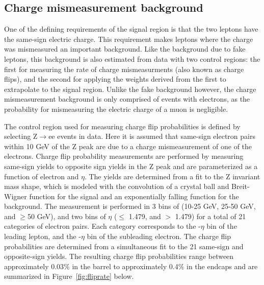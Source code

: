 \subsection{Charge mismeasurement background}
One of the defining requirements of the signal region is that the two leptons have the same-sign electric charge. This requirement makes leptons where the charge was mismeasured an important background. Like the background due to fake leptons,
this background is also estimated from data with two control regions: the first for measuring the rate of charge mismeasurments (also known as charge flips), and the second for applying the weights derived from the first to extrapolate to
the signal region. Unlike the fake background however, the charge mismeasurement background is only comprised of events with electrons, as the probability for mismeasuring the electric charge of a muon is negligible.

The control region used for measuring charge flip probabilities is defined by selecting Z$\rightarrow$ee events in data. Here it is assumed that same-sign electron pairs within 10 GeV of the Z peak are due to a charge mismeasurement of one of
the electrons. Charge flip probability measurements are performed by measuring same-sign yields to opposite sign yields in the Z peak and are parameterized as a function of electron \pt and $\eta$.
The yields are determined from a fit to the Z invariant mass shape, which is modeled with the convolution of a crystal ball and Breit-Wigner function for the signal and an exponentially falling function for the background. 
The measurement is performed in 3 bins of \pt (10-25 GeV, 25-50 GeV, and $\geq$50 GeV), and two bins of $\eta$ ($\leq$ 1.479, and $>$ 1.479) for a total of 21 categories of electron pairs. Each category corresponds to the \pt-$\eta$ bin
of the leading lepton, and the \pt-$\eta$ bin of the subleading electron.  
The charge flip probabilities are determined from a simultaneous fit to the 21 same-sign and opposite-sign yields. The resulting charge flip probabilities range between approximately 0.03$\%$ in the barrel
to approximately 0.4$\%$ in the endcaps and are summarized in Figure~\ref{fig:fliprate} below.


